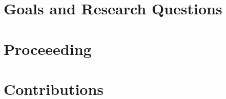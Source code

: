 \section{Goals and Research Questions}
\label{ch:intro-goals}





\section{Proceeeding}
\label{ch:intro-proceeeding}



\section{Contributions}
\label{ch:intro-contributions}



